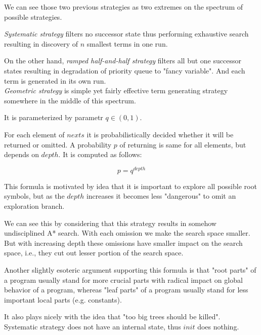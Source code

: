 \documentclass[12pt,a4paper]{report}
\begin{document}
We can see those two previous strategies as two extremes on the spectrum of 
possible strategies.

\textit{Systematic strategy} filters no successor state thus performing
exhaustive search resulting in discovery of $n$ smallest terms in one run.

On the other hand, \textit{ramped half-and-half strategy} filters 
all but one successor states resulting in degradation of 
priority queue to "fancy variable". 
And each term is generated in its own run.\\

\textit{Geometric strategy} is simple yet fairly effective term generating 
strategy somewhere in the middle of this spectrum.

It is parameterized by parametr $q \in (0,1)$. 

For each element of $nexts$ it is probabilistically decided whether
it will be returned or omitted. A probability $p$ of returning is
same for all elements, but depends on $depth$. 
It is computed as follows:

$$ p = q^{depth} $$
   
This formula is motivated by idea that it is important to
explore all possible root symbols, but as the $depth$ 
increases it becomes less "dangerous" to omit 
an exploration branch. 

We can see this by considering that this strategy results in
somehow undisciplined A* search.
With each omission we make the search space smaller. But with
increasing depth these omissions have smaller impact on the search space,
i.e., they cut out lesser portion of the search space.

Another slightly esoteric argument supporting this formula is that "root 
parts" of a program usually stand for more crucial parts
with radical impact on global behavior of a program, 
whereas "leaf parts" of a program usually
stand for less important local parts (e.g. constants).  

It also plays nicely with the idea that "too big trees should be killed".\\



Systematic strategy does not have an internal state, thus $init$ does nothing.
\end{document}
